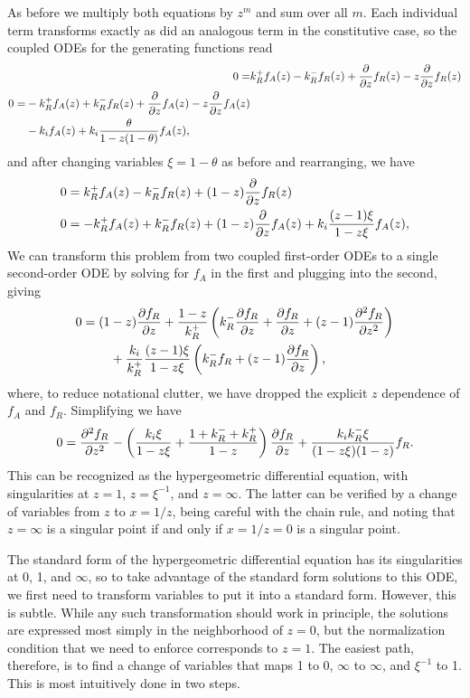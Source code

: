 As before we multiply both equations by $z^m$ and sum over all $m$. Each
individual term transforms exactly as did an analogous term in the constitutive
case, so the coupled ODEs for the generating functions read
\begin{align}
0 =& k_R^+ f_A(z) - k_R^- f_R(z) + \pderiv{z} f_R(z) - z \pderiv{z} f_R(z)
\\
\begin{split}
0 =&  - k_R^+ f_A(z) + k_R^- f_R(z) + \pderiv{z} f_A(z) - z \pderiv{z} f_A(z)
\\
&- k_i f_A(z) + k_i \frac{\theta}{1-z(1-\theta)} f_A(z),
\end{split}
\end{align}
and after changing variables $\xi = 1 - \theta$ as before and rearranging, we
have
\begin{align}
0 &= k_R^+ f_A(z) - k_R^- f_R(z) + (1-z) \pderiv{z} f_R(z)
\\
0 &=  - k_R^+ f_A(z) + k_R^- f_R(z) + (1 - z) \pderiv{z} f_A(z)
+ k_i \frac{(z-1)\xi}{1-z\xi} f_A(z),
\end{align}
We can transform this problem from two coupled first-order ODEs to a single
second-order ODE by solving for $f_A$ in the first and plugging into the second,
giving
\begin{align}
\begin{split}
0 = (1&-z) \pderiv[f_R]{z}
+ \frac{1-z}{k_R^+}
        \left(k_R^- \pderiv[f_R]{z} + \pderiv[f_R]{z} +(z-1) \psecderiv[f_R]{z}\right)
\\
&+ \frac{k_i}{k_R^+} \frac{(z-1)\xi}{1-z\xi}
        \left(k_R^- f_R + (z-1) \pderiv[f_R]{z}\right),
\end{split}
\end{align}
where, to reduce notational clutter, we have dropped the explicit $z$ dependence
of $f_A$ and $f_R$. Simplifying we have
\begin{align}
0 = \psecderiv[f_R]{z}
        - \left(\frac{k_i\xi}{1-z\xi}
                + \frac{1 + k_R^- + k_R^+}{1-z}
        \right)\pderiv[f_R]{z}
        + \frac{k_i k_R^- \xi}{(1-z\xi)(1-z)}f_R.
\end{align}
This can be recognized as the hypergeometric differential equation, with
singularities at $z=1$, $z=\xi^{-1}$, and $z=\infty$. The latter can be verified
by a change of variables from $z$ to $x=1/z$, being careful with the chain rule,
and noting that $z=\infty$ is a singular point if and only if $x=1/z=0$ is a
singular point.

The standard form of the hypergeometric differential equation has its
singularities at 0, 1, and $\infty$, so to take advantage of the standard form
solutions to this ODE, we first need to transform variables to put it into a
standard form. However, this is subtle. While any such transformation should
work in principle, the solutions are expressed most simply in the neighborhood
of $z=0$, but the normalization condition that we need to enforce corresponds to
$z=1$. The easiest path, therefore, is to find a change of variables that maps 1
to 0, $\infty$ to $\infty$, and $\xi^{-1}$ to 1. This is most intuitively done
in two steps.

